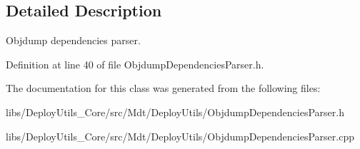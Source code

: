 \subsection{Detailed Description}
Objdump dependencies parser. 

Definition at line 40 of file Objdump\+Dependencies\+Parser.\+h.



The documentation for this class was generated from the following files\+:\begin{DoxyCompactItemize}
\item 
libs/\+Deploy\+Utils\+\_\+\+Core/src/\+Mdt/\+Deploy\+Utils/Objdump\+Dependencies\+Parser.\+h\item 
libs/\+Deploy\+Utils\+\_\+\+Core/src/\+Mdt/\+Deploy\+Utils/Objdump\+Dependencies\+Parser.\+cpp\end{DoxyCompactItemize}

